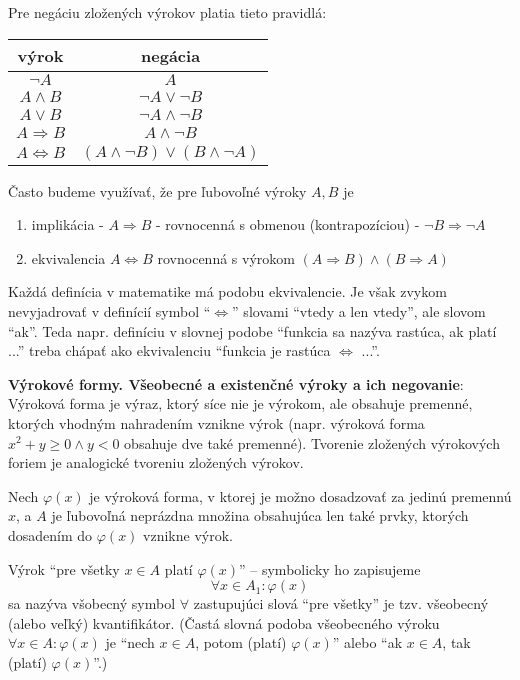Pre negáciu zložených výrokov platia tieto pravidlá:
\begin{center}
  \begin{tabular}{c | c}
    výrok & negácia \\
    \hline
    $\neg A$ & $A$ \\
    $A \land B$ & $\neg A \lor \neg B$ \\
    $A \lor B$ & $\neg A \land \neg B$ \\
    $A \Rightarrow B$ & $A \land \neg B$ \\
    $A \iff B$ & $(A \land \neg B) \lor (B \land \neg A)$ \\
  \end{tabular}
\end{center}

Často budeme využívať, že pre ľubovoľné výroky $A, B$ je
\begin{enumerate}
  \item implikácia - $A \Rightarrow B$ - rovnocenná s obmenou (kontrapozíciou) -
        $\neg B \Rightarrow \neg A$
  \item ekvivalencia $A \iff B$ rovnocenná s výrokom
        $(A \Rightarrow B) \land (B \Rightarrow A)$
\end{enumerate}

Každá definícia v matematike má podobu ekvivalencie. Je však zvykom nevyjadrovať
v definícií symbol \enquote{$\iff$} slovami \enquote{vtedy a len vtedy}, ale
slovom \enquote{ak}. Teda napr. definíciu v slovnej podobe \enquote{funkcia sa
nazýva rastúca, ak platí ...} treba chápať ako ekvivalenciu \enquote{funkcia je
rastúca $\iff$ ...}.

\textbf{Výrokové formy. Všeobecné a existenčné výroky a ich negovanie}:
Výroková forma je výraz, ktorý síce nie je výrokom, ale obsahuje premenné,
ktorých vhodným nahradením vznikne výrok (napr. výroková forma $x^2 + y \geq 0
\land y < 0$ obsahuje dve také premenné). Tvorenie zložených výrokových foriem
je analogické tvoreniu zložených výrokov.

Nech $\varphi (x)$ je výroková forma, v ktorej je možno dosadzovať za jedinú
premennú $x$, a $A$ je ľubovoľná neprázdna množina obsahujúca len také prvky,
ktorých dosadením do $\varphi (x)$ vznikne výrok.

Výrok \enquote{pre všetky $x \in A$ platí $\varphi (x)$} -- symbolicky ho
zapisujeme
\[
  \forall x \in A_1: \varphi (x)
\]
sa nazýva všobecný symbol $\forall$ zastupujúci slová \enquote{pre všetky} je
tzv. všeobecný (alebo veľký) kvantifikátor. (Častá slovná podoba všeobecného
výroku $\forall x \in A : \varphi (x)$ je \enquote{nech $x \in A$, potom
(platí) $\varphi (x)$} alebo \enquote{ak $x \in A$, tak (platí) $\varphi
(x)$}.)


